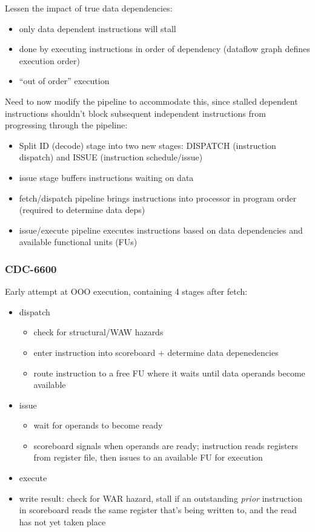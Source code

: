 \documentclass[12pt]{extarticle}
\begin{document}
	Lessen the impact of true data dependencies:

	\begin{itemize}
		\item only data dependent instructions will stall
		\item done by executing instructions in order of dependency (dataflow graph defines execution order)
		\item ``out of order'' execution
	\end{itemize}

	\noindent Need to now modify the pipeline to accommodate this, since stalled dependent instructions shouldn't block 
	subsequent independent instructions from progressing through the pipeline:

	\begin{itemize}
		\item Split ID (decode) stage into two new stages: DISPATCH (instruction dispatch) and ISSUE (instruction schedule/issue)
		\item issue stage buffers instructions waiting on data
		\item fetch/dispatch pipeline brings instructions into processor in program order (required to determine data deps)
		\item issue/execute pipeline executes instructions based on data dependencies and available functional units (FUs)
	\end{itemize}

	\subsubsection{CDC-6600}

	Early attempt at OOO execution, containing 4 stages after fetch:

	\begin{itemize}
		\item dispatch
		\begin{itemize}
			\item check for structural/WAW hazards
			\item enter instruction into scoreboard + determine data depenedencies
			\item route instruction to a free FU where it waits until data operands become available
		\end{itemize}

		\item issue
		\begin{itemize}
			\item wait for operands to become ready
			\item scoreboard signals when operands are ready; instruction reads registers from register file, then issues 
			to an available FU for execution
		\end{itemize}

		\item execute
		\item write result: check for WAR hazard, stall if an outstanding \textit{prior} instruction in scoreboard reads 
		the same register that's being written to, and the read has not yet taken place
	\end{itemize}
\end{document}

